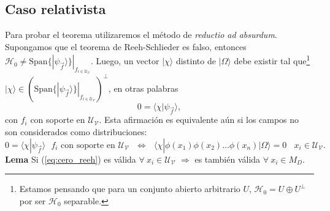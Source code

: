 \subsection{Caso relativista}
Para probar el teorema utilizaremos el método de \textit{reductio ad absurdum}. Supongamos que el teorema de Reeh-Schlieder es falso, entonces $\mathcal{H}_0\neq\text{Span}\{|\psi_{\vec{f}}\rangle\}|_{f_{i\in \mathcal{U}_{\mathcal{V}}}}$. Luego, un vector $|\chi\rangle$ distinto de $|\Omega\rangle$ debe existir tal que\footnote{Estamos pensando que para un conjunto abierto arbitrario $U$, $\mathcal{H}_0=U\oplus U^{\perp}$ por ser $\mathcal{H}_0$ separable.} $|\chi\rangle\in\left(\text{Span}\{|\psi_{\vec{f}}\rangle\}|_{f_{i\in \mathcal{U}_{\mathcal{V}}}}\right)^{\perp}$, en otras palabras
\begin{equation}
0=\langle \chi|\psi_{\vec{f}}\rangle,
\end{equation}
con $f_i$ con soporte en $\mathcal{U}_{\mathcal{V}}$. Esta afirmación es equivalente aún si los campos no son considerados como distribuciones:
\begin{equation}
0=\langle \chi|\psi_{\vec{f}}\rangle \:\:\:f_i\text{ con soporte en }\mathcal{U}_{\mathcal{V}} \:\:\: \Leftrightarrow \:\:\:\langle \chi|\phi(x_1)\phi(x_2)\ldots\phi(x_n)|\Omega\rangle=0\:\:\:\:x_i \in \mathcal{U}_{\mathcal{V}}.
\label{eq:cero_reeh}
\end{equation}
\textbf{Lema} Si (\ref{eq:cero_reeh}) es válida $\forall \:x_i \in \mathcal{U}_{\mathcal{V}}$ $\Rightarrow$ es también válida $\forall \:x_i \in M_D$.\\

